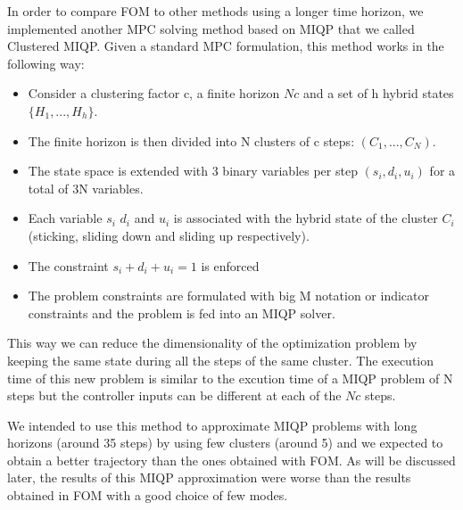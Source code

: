 \documentclass[12,twoside]{TFG-GM}
\theoremstyle{definition}
\theoremstyle{remark}
\begin{document}
In order to compare FOM to other methods using a longer time horizon, we implemented another MPC solving method based on MIQP that we called Clustered MIQP. Given a standard MPC formulation, this method works in the following way:

\begin{itemize}
\item Consider a clustering factor c, a finite horizon $ N c$ and a set of h hybrid states $ \{ H_1, ..., H_h \}$.
\item The finite horizon is then divided into N clusters of c steps: $(C_1, ..., C_N)$.
\item The state space is extended with 3 binary variables per step $(s_i, d_i, u_i)$ for a total of 3N variables.
\item Each variable $s_i$ $d_i$ and $u_i$ is associated with the hybrid state of the cluster $C_i$ (sticking, sliding down and sliding up respectively).
\item The constraint $s_i + d_i + u_i = 1$ is enforced 
\item The problem constraints are formulated with big M notation or indicator constraints and the problem is fed into an MIQP solver.
\end{itemize}

This way we can reduce the dimensionality of the optimization problem by keeping the same state during all the steps of the same cluster. The execution time of this new problem is similar to the excution time of a MIQP problem of N steps but the controller inputs can be different at each of the $N c$ steps.

We intended to use this method to approximate MIQP problems with long horizons (around 35 steps) by using few clusters (around 5) and we expected to obtain a better trajectory than the ones obtained with FOM. As will be discussed later, the results of this MIQP approximation were worse than the results obtained in FOM with a good choice of few modes.
\end{document}
